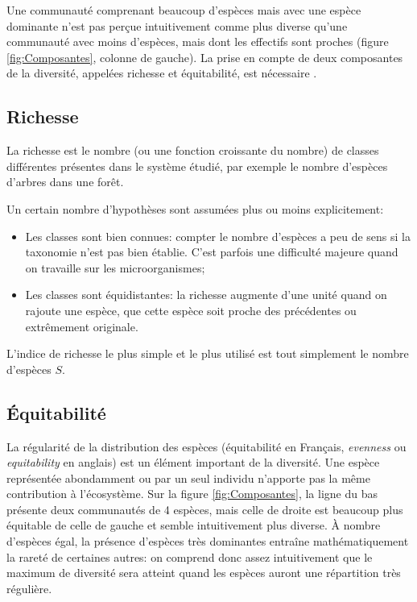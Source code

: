 \documentclass[
  11pt,
  french,
  a4paper,
  extrafontsizes,onecolumn,openright
  ]{memoir}
\providecommand{\tightlist}{%
  \setlength{\itemsep}{0pt}\setlength{\parskip}{0pt}}
\newlength{\rf}
\begin{document}
\normalsize

Une communauté comprenant beaucoup d'espèces mais avec une espèce dominante n'est pas perçue intuitivement comme plus diverse qu'une communauté avec moins d'espèces, mais dont les effectifs sont proches (figure \ref{fig:Composantes}, colonne de gauche).
La prise en compte de deux composantes de la diversité, appelées richesse et équitabilité, est nécessaire \autocite{Whittaker1965}.

\subsection{Richesse}\label{richesse}

La richesse \autocite[terme introduit par][]{Mcintosh1967} est le nombre (ou une fonction croissante du nombre) de classes différentes présentes dans le système étudié, par exemple le nombre d'espèces d'arbres dans une forêt.

Un certain nombre d'hypothèses sont assumées plus ou moins explicitement:

\begin{itemize}
\tightlist
\item
  Les classes sont bien connues: compter le nombre d'espèces a peu de sens si la taxonomie n'est pas bien établie.
  C'est parfois une difficulté majeure quand on travaille sur les microorganismes;
\item
  Les classes sont équidistantes: la richesse augmente d'une unité quand on rajoute une espèce, que cette espèce soit proche des précédentes ou extrêmement originale.
\end{itemize}

L'indice de richesse le plus simple et le plus utilisé est tout simplement le nombre d'espèces \(S\).

\subsection{Équitabilité}\label{uxe9quitabilituxe9}

La régularité de la distribution des espèces (équitabilité en Français, \emph{evenness} ou \emph{equitability} en anglais) est un élément important de la diversité.
Une espèce représentée abondamment ou par un seul individu n'apporte pas la même contribution à l'écosystème.
Sur la figure \ref{fig:Composantes}, la ligne du bas présente deux communautés de 4 espèces, mais celle de droite est beaucoup plus équitable de celle de gauche et semble intuitivement plus diverse.
À nombre d'espèces égal, la présence d'espèces très dominantes entraîne mathématiquement la rareté de certaines autres: on comprend donc assez intuitivement que le maximum de diversité sera atteint quand les espèces auront une répartition très régulière.
\end{document}
